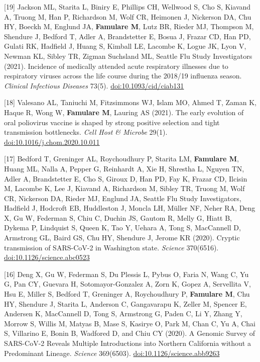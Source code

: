 \documentclass{article}
\begin{document}
\begin{llist}
\begin{items}
\item[{[19]}] Jackson ML, Starita L, Biniry E, Phillips CH, Wellwood S, Cho S, Kiavand A, Truong M, Han P, Richardson M, Wolf CR, Heimonen J, Nickerson DA, Chu HY, Boeckh M, Englund JA, \textbf{Famulare M}, Lutz BR, Rieder MJ, Thompson M, Shendure J, Bedford T, Adler A, Brandstetter E, Bosua J, Frazar CD, Han PD, Gulati RK, Hadfield J, Huang S, Kimball LE, Lacombe K, Logue JK, Lyon V, Newman KL, Sibley TR, Zigman Suchsland ML, Seattle Flu Study Investigators (2021). Incidence of medically attended acute respiratory illnesses due to respiratory viruses across the life course during the 2018/19 influenza season. \emph{Clinical Infectious Diseases} 73(5). \href{https://doi.org/10.1093/cid/ciab131}{doi:10.1093/cid/ciab131}

\item[{[18]}] Valesano AL, Taniuchi M, Fitzsimmons WJ, Islam MO, Ahmed T, Zaman K, Haque R, Wong W, \textbf{Famulare M}, Lauring AS (2021). The early evolution of oral poliovirus vaccine is shaped by strong positive selection and tight transmission bottlenecks. \emph{Cell Host \& Microbe} 29(1). \href{https://doi.org/10.1016/j.chom.2020.10.011}{doi:10.1016/j.chom.2020.10.011}

\item[{[17]}] Bedford T, Greninger AL, Roychoudhury P, Starita LM, \textbf{Famulare M}, Huang ML, Nalla A, Pepper G, Reinhardt A, Xie H, Shrestha L, Nguyen TN, Adler A, Brandstetter E, Cho S, Giroux D, Han PD, Fay K, Frazar CD, Ilcisin M, Lacombe K, Lee J, Kiavand A, Richardson M, Sibley TR, Truong M, Wolf CR, Nickerson DA, Rieder MJ, Englund JA, Seattle Flu Study Investigators, Hadfield J, Hodcroft EB, Huddleston J, Moncla LH, M\"uller NF, Neher RA, Deng X, Gu W, Federman S, Chiu C, Duchin JS, Gautom R, Melly G, Hiatt B, Dykema P, Lindquist S, Queen K, Tao Y, Uehara A, Tong S, MacCannell D, Armstrong GL, Baird GS, Chu HY, Shendure J, Jerome KR (2020). 
Cryptic transmission of SARS-CoV-2 in Washington state. \emph{Science} 370(6516). \href{https://doi.org/10.1126/science.abc0523}{doi:10.1126/science.abc0523}

\item[{[16]}] Deng X, Gu W, Federman S, Du Plessis L, Pybus O, Faria N, Wang C, Yu G, Pan CY, Guevara H, Sotomayor-Gonzalez A, Zorn K, Gopez A, Servellita V, Hsu E, Miller S, Bedford T, Greninger A, Roychoudhury P, \textbf{Famulare M}, Chu HY, Shendure J, Starita L, Anderson C, Gangavarapu K, Zeller M, Spencer E, Andersen K, MacCannell D, Tong S, Armstrong G, Paden C, Li Y, Zhang Y, Morrow S, Willis M, Matyas B, Mase S, Kasirye O, Park M, Chan C, Yu A, Chai S, Villarino E, Bonin B, Wadfored D, and Chiu CY	(2020). A Genomic Survey of SARS-CoV-2 Reveals Multiple Introductions into Northern California without a Predominant Lineage. \emph{Science} 369(6503). \href{https://doi.org/10.1126/science.abb9263}{doi:10.1126/science.abb9263}


\end{items}
\end{llist}
\end{document}

